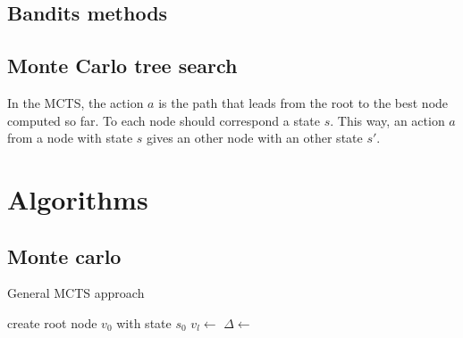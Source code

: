 \documentclass{article}
\begin{document}
\subsection{Bandits methods}

\subsection{Monte Carlo tree search}
In the MCTS, the action \(a\) is the path that leads from the root to the best
node computed so far. To each node should correspond a state \(s\). This way, an
action \(a\) from a node with state \(s\) gives an other node with an other
state \(s'\).




\section{Algorithms}
\subsection{Monte carlo}
\begin{algorithm}
  \caption{General MCTS approach~\cite{browne2012survey}}
  \begin{algorithmic}
    \State{}create root node \(v_0\) with state \(s_0\)
    \State{} \(v_l \gets\) 
    \State{} \(\Delta \gets\) 
    \State{} 
    \EndWhile{}
    \EndFunction{}
  \end{algorithmic}
\end{algorithm}
\end{document}
